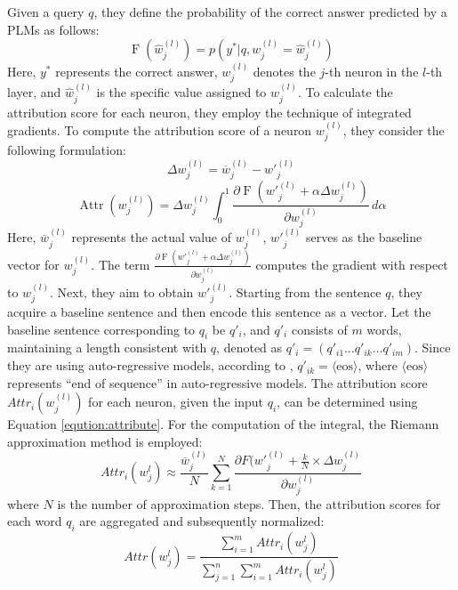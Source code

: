 Given a query \(q\), they  define the probability of the correct answer predicted by a PLMs as follows:
\begin{equation}
\label{eq:1}
    \operatorname{F}(\hat{w}^{(l)}_{j}) = p(y^* | q, w^{(l)}_{j}=\hat{w}^{(l)}_{j})
\end{equation}
Here, \(y^*\) represents the correct answer, \(w^{(l)}_{j}\) denotes the \(j\)-th neuron in the \(l\)-th layer, and \(\hat{w}^{(l)}_{j}\) is the specific value assigned to \(w^{(l)}_{j}\). To calculate the attribution score for each neuron, they employ the technique of integrated gradients.
To compute the attribution score of a neuron \(w^{(l)}_{j}\), they consider the following formulation:
\begin{equation}
    \Delta w^{(l)}_{j} = \overline{w}^{(l)}_{j} - {w'}^{(l)}_{j}
\end{equation}
\begin{equation}
    \label{eqution:attribute}
     \operatorname{Attr}({w}^{(l)}_{j}) = \Delta w^{(l)}_{j} \int_{0}^{1} \frac{\partial \operatorname{F}({w'}^{(l)}_{j} + \alpha\Delta w^{(l)}_{j})}{\partial {w}^{(l)}_{j}}  \, d\alpha
\end{equation}Here, \(\overline{w}^{(l)}_{j}\) represents the actual value of \(w^{(l)}_{j}\),
\(w'^{(l)}_{j}\) serves as the baseline vector for \(w^{(l)}_{j}\). The term \(\frac{\partial \operatorname{F}(w'^{(l)}_{j} + \alpha\Delta w^{(l)}_{j})}{\partial w^{(l)}_{j}}\) computes the gradient with respect to \(w^{(l)}_{j}\).  
Next, they aim to obtain ${w'}^{(l)}_{j}$. Starting from the sentence $q$, they acquire a baseline sentence and then encode this sentence as a vector.
Let the baseline sentence corresponding to $q_i$ be $q'_i$, and $q'_i$ consists of $m$ words, maintaining a length consistent with $q$, denoted as $q'_i=(q'_{i1} \ldots q'_{ik} \ldots q'_{im})$. Since they are using auto-regressive models, according to \citet{chen2024journey}, $q'_{ik}=\langle \text{eos}\rangle$, where $\langle \text{eos}\rangle$ represents ``end of sequence'' in auto-regressive models.
The attribution score \(Attr_i(w_j^{(l)})\) for each neuron, given the input \(q_i\), can be determined using Equation \eqref{eqution:attribute}. For the computation of the integral, the Riemann approximation method is employed:
\begin{equation}
    {Attr_i(w_j^l)} \approx \frac{\overline{w}^{(l)}_{j}}{N} \sum_{k=1}^{N} \frac{ \partial F({w'}^{(l)}_{j} + \frac{k}{N} \times \Delta w^{(l)}_{j}}{\partial {w}^{(l)}_{j}}
\end{equation}where $N$ is the number of approximation steps.
Then, the attribution scores for each word \(q_i\) are aggregated and subsequently normalized:
\begin{equation}
    Attr(w_j^l) = \frac{\sum_{i=1}^{m} Attr_i(w_j^l)}{\sum_{j=1}^{n} \sum_{i=1}^{m} Attr_i(w_j^l)}
\end{equation}

